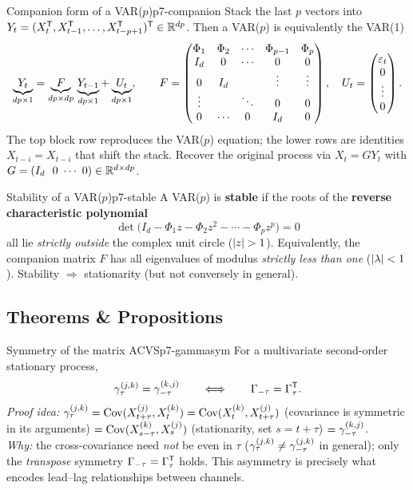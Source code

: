 \begin{definition}{Companion form of a VAR($p$)}{p7-companion}
Stack the last $p$ vectors into $Y_t=(X_t^{\mathsf{T}},X_{t-1}^{\mathsf{T}},\dots,X_{t-p+1}^{\mathsf{T}})^{\mathsf{T}}
\in\mathbb{R}^{dp}$. Then a VAR($p$) is equivalently the VAR(1)
\[
\underbrace{Y_t}_{dp\times1}
=\underbrace{F}_{dp\times dp}\,\underbrace{Y_{t-1}}_{dp\times1}
+\underbrace{U_t}_{dp\times1},
\qquad
F=\begin{pmatrix}
\Phi_1 & \Phi_2 & \cdots & \Phi_{p-1} & \Phi_p\\
I_d & 0 & \cdots & 0 & 0\\
0 & I_d & & \vdots & \vdots\\
\vdots & & \ddots & 0 & 0\\
0 & \cdots & 0 & I_d & 0
\end{pmatrix},
\quad
U_t=\begin{pmatrix}\varepsilon_t\\0\\\vdots\\0\end{pmatrix}.
\]
The top block row reproduces the VAR($p$) equation; the lower rows are
identities $X_{t-i}=X_{t-i}$ that shift the stack. Recover the original process
via $X_t=G Y_t$ with $G=(I_d\ \ 0\ \cdots\ 0)\in\Reals^{d\times dp}$.
\end{definition}

\begin{definition}{Stability of a VAR($p$)}{p7-stable}
A VAR($p$) is \textbf{stable} if the roots of the \textbf{reverse
characteristic polynomial}
\[
\det\!\big(I_d-\Phi_1 z-\Phi_2 z^2-\cdots-\Phi_p z^p\big)=0
\]
all lie \emph{strictly outside} the complex unit circle ($\left\lvert z \right\rvert>1$).
Equivalently, the companion matrix $F$ has all eigenvalues of modulus
\emph{strictly less than one} ($\left\lvert \lambda \right\rvert<1$). Stability $\Rightarrow$
stationarity (but not conversely in general).
\end{definition}

\subsection{Theorems \& Propositions}

\begin{proposition}{Symmetry of the matrix ACVS}{p7-gammasym}
For a multivariate second-order stationary process,
\[
\gamma_\tau^{(j,k)}=\gamma_{-\tau}^{(k,j)}
\qquad\Longleftrightarrow\qquad
\Gamma_{-\tau}=\Gamma_\tau^{\mathsf{T}} .
\]
\textit{Proof idea:} $\gamma_\tau^{(j,k)}=\operatorname{Cov}(X_{t+\tau}^{(j)},X_t^{(k)})
=\operatorname{Cov}(X_t^{(k)},X_{t+\tau}^{(j)})$ (covariance is symmetric in its arguments)
$=\operatorname{Cov}(X_{s-\tau}^{(k)},X_s^{(j)})$ (stationarity, set $s=t+\tau$)
$=\gamma_{-\tau}^{(k,j)}$.\\
\textit{Why:} the cross-covariance need \emph{not} be even in $\tau$
($\gamma_\tau^{(j,k)}\ne\gamma_{-\tau}^{(j,k)}$ in general); only the
\emph{transpose} symmetry $\Gamma_{-\tau}=\Gamma_\tau^{\mathsf{T}}$ holds. This asymmetry
is precisely what encodes lead--lag relationships between channels.
\end{proposition}

